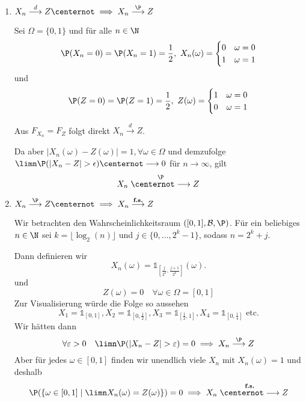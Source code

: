 \begin{enumerate}
    \item $X_n \overset{d}{\longrightarrow} Z \centernot\implies X_n \overset{\P}{\longrightarrow} Z$
    
    Sei $\Omega = \{0, 1\}$ und für alle $n \in \N$
    $$\P(X_n = 0) = \P(X_n = 1) = \frac{1}{2}, \ X_n(\omega) = \begin{cases}
        0 & \omega = 0\\
        1 & \omega = 1
    \end{cases} 
    $$
    und $$\P(Z = 0) = \P(Z = 1) = \frac{1}{2}, \ Z(\omega) = \begin{cases}
        1 & \omega = 0\\
        0 & \omega = 1
    \end{cases} $$

    Aus $F_{X_n} = F_Z$ folgt direkt $X_n \overset{d}{\longrightarrow} Z$.
    
    Da aber $|X_n(\omega) - Z(\omega)| = 1, \forall \omega \in \Omega$ und demzufolge\\ 
    $\limn \P(|X_n - Z| > \epsilon) \centernot\longrightarrow 0$ für $n \to \infty$, gilt  
    $$X_n \overset{\P}{\centernot\longrightarrow} Z$$
    \item $X_n \overset{\P}{\longrightarrow} Z \centernot\implies X_n \overset{\textbf{f.s.}}{\longrightarrow} Z$
    
    Wir betrachten den Wahrscheinlichkeitsraum $([0,1], \mathcal{B}, \P)$.
    Für ein beliebiges $n \in \N$ sei $k = \lfloor\log_2(n)\rfloor$ und $j \in \{0, \ldots, 2^k-1\}$, sodass $n = 2^k + j$.
    
    Dann definieren wir 
    $$X_n(\omega) = \mathds{1}_{\left[\frac{j}{2^k}, \frac{j+1}{2^k}\right]}(\omega).$$
    und
    $$Z(\omega) = 0 \quad \forall \omega \in \Omega = [0,1]$$
    Zur Visualisierung würde die Folge so aussehen
    $$X_1 = \mathds{1}_{[0,1]}, X_2 = \mathds{1}_{\left[0,\frac{1}{2}\right]}, X_3 = \mathds{1}_{\left[\frac{1}{2}, 1\right]}, X_4 = \mathds{1}_{\left[0,\frac{1}{4}\right]} \text{ etc.}$$
    Wir hätten dann
    $$\forall \varepsilon > 0 \quad \limn \P(|X_n - Z| > \varepsilon) = 0 \implies X_n \overset{\P}{\longrightarrow} Z$$
    Aber für jedes $\omega \in [0,1]$ finden wir unendlich viele $X_n$ mit $X_n(\omega) = 1$ und deshalb
    $$\P(\{\omega \in [0,1] \mid \limn X_n(\omega) = Z(\omega)\}) = 0 \implies X_n \overset{\textbf{f.s.}}{\centernot\longrightarrow} Z$$
\end{enumerate}
